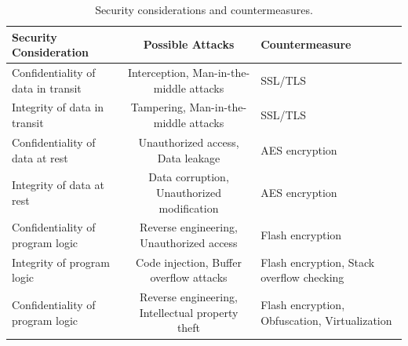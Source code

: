 \documentclass[conference]{IEEEtran}
\begin{document}
\begin{table}[h]
\centering
\begin{adjustbox}{width=\columnwidth,center}
\begin{tabular}{|l|c||l|}
\hline
\textbf{Security Consideration} & \textbf{Possible Attacks} & \textbf{Countermeasure} \\ \hline
Confidentiality of data in transit & Interception, Man-in-the-middle attacks          & SSL/TLS \\ \hline
Integrity of data in transit       & Tampering, Man-in-the-middle attacks             & SSL/TLS \\ \hline
Confidentiality of data at rest    & Unauthorized access, Data leakage                & AES encryption \\ \hline
Integrity of data at rest          & Data corruption, Unauthorized modification       & AES encryption \\ \hline
Confidentiality of program logic   & Reverse engineering, Unauthorized access         & Flash encryption \\ \hline
Integrity of program logic         & Code injection, Buffer overflow attacks          & Flash encryption, Stack overflow checking \\ \hline
Confidentiality of program logic   & Reverse engineering, Intellectual property theft & Flash encryption, Obfuscation, Virtualization \\ \hline
\end{tabular}
\end{adjustbox}
\caption{Security considerations and countermeasures.}
\label{tab:security_considerations}
\end{table}


\end{document}
